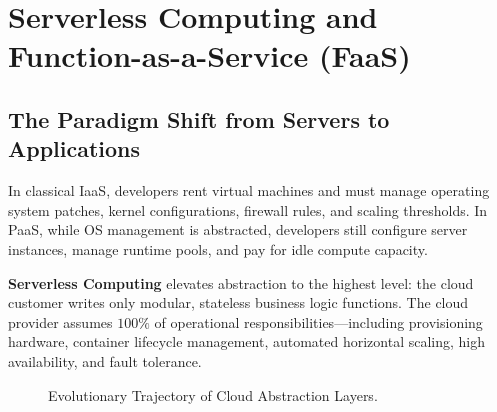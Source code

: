 \section{Serverless Computing and Function-as-a-Service (FaaS)}
\subsection{The Paradigm Shift from Servers to Applications}
In classical IaaS, developers rent virtual machines and must manage operating system patches, kernel configurations, firewall rules, and scaling thresholds. In PaaS, while OS management is abstracted, developers still configure server instances, manage runtime pools, and pay for idle compute capacity.

\textbf{Serverless Computing} elevates abstraction to the highest level: the cloud customer writes only modular, stateless business logic functions. The cloud provider assumes $100\%$ of operational responsibilities—including provisioning hardware, container lifecycle management, automated horizontal scaling, high availability, and fault tolerance.

\begin{figure}[H]
\centering
{}
\caption{Evolutionary Trajectory of Cloud Abstraction Layers.}
\end{figure}

